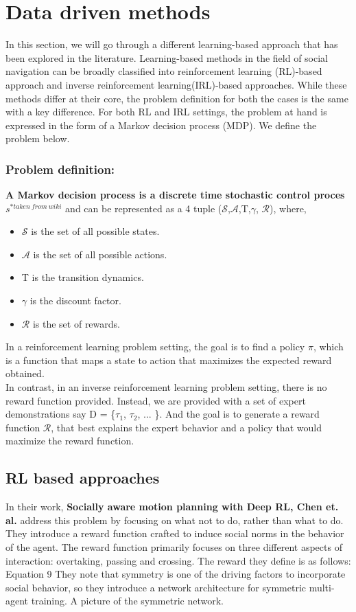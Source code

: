 \section{Data driven methods}
In this section, we will go through a different learning-based approach that has been explored in the literature. Learning-based methods in the field of social navigation can be broadly classified into reinforcement learning (RL)-based approach and inverse reinforcement learning(IRL)-based approaches. While these methods differ at their core, the problem definition for both the cases is the same with a key difference. For both RL and IRL settings, the problem at hand is expressed in the form of a Markov decision process (MDP). We define the problem below.
\subsubsection*{Problem definition:}
\textbf{A Markov decision process is a discrete time stochastic control proces$s^{*taken\ from\ wiki}$} and can be represented as a 4 tuple
($\mathcal{S}$,$\mathcal{A}$,T,$\gamma$, $\mathcal{R}$), where,
\begin{itemize}
	\item $\mathcal{S}$ is the set of all possible states.
	\item $\mathcal{A}$ is the set of all possible actions.
	\item T is the transition dynamics.
	\item $\gamma$ is the discount factor.
	\item $\mathcal{R}$ is the set of rewards.
\end{itemize}  
In a reinforcement learning problem setting, the goal is to find a policy $\pi$, which is a function that maps a state to action that maximizes the expected reward obtained.\\
In contrast, in an inverse reinforcement learning problem setting, there is no reward function provided. Instead, we are provided with a set of expert demonstrations say D = \{$\tau_1$, $\tau_2$, ... \}. And the goal is to generate a reward function $\mathcal{R}$, that best explains the expert behavior and a policy that would maximize the reward function.


\subsection*{RL based approaches}
 In their work, \textbf{Socially aware motion planning with Deep RL, Chen et. al.} address this problem by focusing on what not to do, rather than what to do. They introduce a reward function crafted to induce social norms in the behavior of the agent.
The reward function primarily focuses on three different aspects of interaction: overtaking, passing and crossing. The reward they define is as follows:
Equation 9
They note that symmetry is one of the driving factors to incorporate social behavior, so they introduce a network architecture for symmetric multi-agent training.
A picture of the symmetric network.

